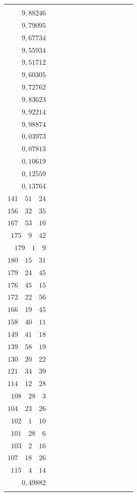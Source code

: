 \begin{landscape}
\begin{center}
\begin{tabular}{r|r|r|r|r|r|r|r|r|r|r|r|r}
{\(9{,}95380\) \\
\(9{,}88246\) \\
\(9{,}79095\) \\
\(9{,}67734\) \\[3pt]
\(9{,}55934\) \\
\(9{,}51712\) \\
\(9{,}60305\) \\
\(9{,}72762\) \\[3pt]
\(9{,}83623\) \\
\(9{,}92214\) \\
\(9{,}98874\) \\
\(0{,}03973\) \\[3pt]
\(0{,}07813\) \\
\(0{,}10619\) \\
\(0{,}12559\) \\
\(0{,}13764\)
}
&
\GaussVIIcolumn{
\(126^0\quad 55'\quad 39''\) \\
\(141\quad 51\quad 24\) \\
\(156\quad 32\quad 35\) \\
\(167\quad 53\quad 10\) \\[3pt]
\(175\quad 9\quad 42\) \\
\(179\quad 1\quad 9\) \\
\(180\quad 15\quad 31\) \\
\(179\quad 24\quad 45\) \\[3pt]
\(176\quad 45\quad 15\) \\
\(172\quad 22\quad 56\) \\
\(166\quad 19\quad 45\) \\
\(158\quad 40\quad 11\) \\[3pt]
\(149\quad 41\quad 18\) \\
\(139\quad 58\quad 19\) \\
\(130\quad 20\quad 22\) \\
\(121\quad 34\quad 39\) \\[3pt]
\(114\quad 12\quad 28\) \\
\(108\quad 28\quad 3\) \\
\(104\quad 23\quad 26\) \\
\(102\quad 1\quad 10\) \\[3pt]
\(101\quad 28\quad 6\) \\
\(103\quad 2\quad 16\) \\
\(107\quad 18\quad 26\) \\
\(115\quad 4\quad 14\)
}
&
\GaussVIIcolumn{
\(0{,}51574\) \\
\(0{,}49882\) \\
}
\end{tabular}
\end{center}
\end{landscape}
